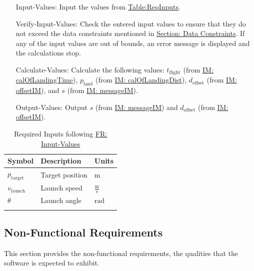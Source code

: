 \documentclass[12pt]{article}
\begin{document}
\begin{itemize}
\item[Input-Values:\phantomsection\label{inputValues}]{Input the values from \hyperref[Table:ReqInputs]{Table:ReqInputs}.}
\item[Verify-Input-Values:\phantomsection\label{verifyInVals}]{Check the entered input values to ensure that they do not exceed the data constraints mentioned in \hyperref[Sec:DataConstraints]{Section: Data Constraints}. If any of the input values are out of bounds, an error message is displayed and the calculations stop.}
\item[Calculate-Values:\phantomsection\label{calcValues}]{Calculate the following values: ${t_{\text{flight}}}$ (from \hyperref[IM:calOfLandingTime]{IM: calOfLandingTime}), ${p_{\text{land}}}$ (from \hyperref[IM:calOfLandingDist]{IM: calOfLandingDist}), ${d_{\text{offset}}}$ (from \hyperref[IM:offsetIM]{IM: offsetIM}), and $s$ (from \hyperref[IM:messageIM]{IM: messageIM}).}
\item[Output-Values:\phantomsection\label{outputValues}]{Output $s$ (from \hyperref[IM:messageIM]{IM: messageIM}) and ${d_{\text{offset}}}$ (from \hyperref[IM:offsetIM]{IM: offsetIM}).}
\end{itemize}
\begin{longtable}{l l l}
\toprule
\textbf{Symbol} & \textbf{Description} & \textbf{Units}
\\
\midrule
\endhead
${p_{\text{target}}}$ & Target position & ${\text{m}}$
\\
${v_{\text{launch}}}$ & Launch speed & $\frac{\text{m}}{\text{s}}$
\\
$θ$ & Launch angle & ${\text{rad}}$
\\
\bottomrule
\caption{Required Inputs following \hyperref[inputValues]{FR: Input-Values}}
\label{Table:ReqInputs}
\end{longtable}
\subsection{Non-Functional Requirements}
\label{Sec:NFRs}
This section provides the non-functional requirements, the qualities that the software is expected to exhibit.
\end{document}
